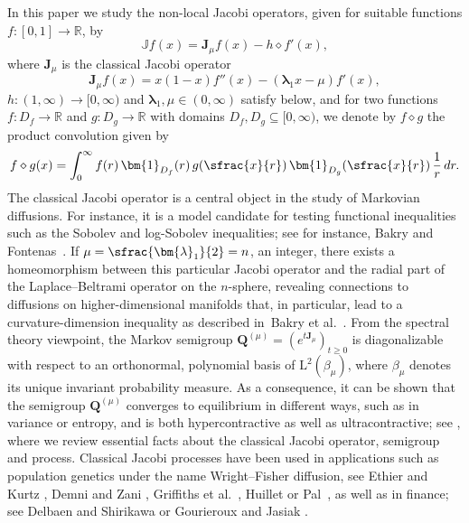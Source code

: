 \documentclass[10pt]{amsart}
\theoremstyle{plain}
\theoremstyle{definition}
\newcommand{\R}{\mathbb{R}}
\newcommand{\calJ}{\mathds{J}}
\newcommand{\Leb}{\mathrm{L}}
\newcommand{\calJd}{\mathbf{J}}
\newcommand{\lam}{{\bm{\lambda}_1}}
\newcommand{\Q}[1][\mo]{\mathbf{Q}^{({#1})}}
\newcommand{\gab}[1][\lam,\mo]{{\beta_{#1}}}
\let\mo\mu
\begin{document}
In this paper we study the non-local Jacobi operators, given for suitable functions $f \colon [0,1] \to \R$, by
\begin{equation}
\label{eq:defJ}
\calJ f(x) = \calJd_\mo f(x) - h \diamond f'(x),
\end{equation}
where $\calJd_\mo$ is the classical Jacobi operator
\begin{equation*}
\calJd_\mo f(x)= x (1-x)f''(x)-\left(\lam x-\mo\right)f'(x),
\end{equation*}
$h \colon (1,\infty) \to [0,\infty)$ and $\lam, \mo \in (0, \infty)$ satisfy  below,
and for two func\-tions $f \colon D_f \to \R$ and $g \colon D_g \to \R$ with domains $D_f, D_g \subseteq [0, \infty)$,
we denote by $f \diamond g$ the product convolution given by
\begin{equation}
\label{eq:defd}
f \diamond g(x) = \int_0^{\infty} f(r)\, \bm{1}_{D_f}(r)\, g(\sfrac{x}{r})\, \bm{1}_{D_g}(\sfrac{x}{r})\, \frac{1}{r}\, dr.
\end{equation}
The classical Jacobi operator is a central object in the study of Markovian diffusions. For instance, it is a model candidate for testing functional inequalities such as the Sobolev and log-Sobolev inequalities; see for instance, Bakry \cite{Bakry-Jacobi} and Fontenas~\cite{fontenas:1998}. If $\mo = \sfrac{\lam}{2} = n$, an integer, there exists a homeomorphism between this particular Jacobi operator and the radial part of the Laplace--Beltrami operator on the $n$-sphere, revealing connections to diffusions on higher-dimensional manifolds that, in particular, lead to a curvature-dimension inequality as described in~Bakry et al.~\cite[Chap.\,2.7]{Bakry_Book}. From the spectral theory viewpoint, the Markov semigroup $\Q[\mo] = (e^{t\calJd_\mo})_{t \geq 0}$ is diagonalizable with respect to an orthonormal, polynomial basis of $\Leb^2(\gab[\mo])$, where $\gab[\mo]$ denotes its unique invariant probability measure. As a consequence, it can be shown that the semigroup $\Q[\mo]$ converges to equilibrium in different ways, such as in variance or entropy, and is both hypercontractive as well as ultracontractive; see , where we review essential facts about the classical Jacobi operator, semigroup and process. Classical
Jacobi processes have been used in applications such as population genetics under the name Wright--Fisher diffusion, see \eg Ethier and Kurtz \cite[Chap.\,10]{EthierKurtz}, Demni and Zani \cite{dem}, Griffiths et al.~\cite{griffiths:2010,griffiths2018}, Huillet \cite{huillet2007wright} or Pal~\cite{pal2013},
as well as in finance; see \eg Delbaen and Shirikawa \cite{delbaen2002interest} or Gourieroux and Jasiak \cite{gourieroux2006}.
\end{document}
